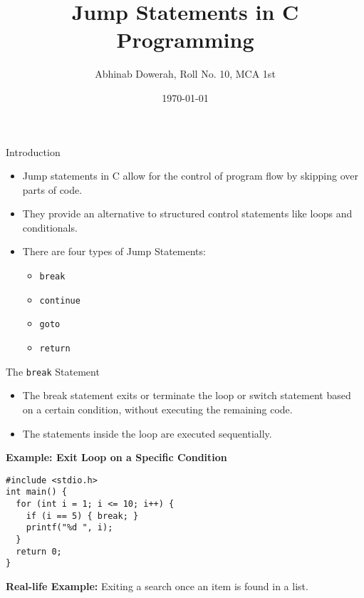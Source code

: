 \documentclass{beamer}
\title{Jump Statements in C Programming}
\author{Abhinab Dowerah, Roll No. 10, MCA 1st}
\date{\today}
\begin{document}
\begin{frame}
    \titlepage
\end{frame}

\begin{frame}{Introduction}
    \begin{itemize}
        \item Jump statements in C allow for the control of program flow by skipping over parts of code.
        \item They provide an alternative to structured control statements like loops and conditionals.
        \item There are four types of Jump Statements:
        \begin{itemize}
            \item \texttt{break}
            \item \texttt{continue}
            \item \texttt{goto}
            \item \texttt{return}
        \end{itemize}
    \end{itemize}
\end{frame}

\begin{frame}{The \texttt{break} Statement}
    \begin{itemize}
        \item The break statement exits or terminate the loop or switch statement based on a certain condition, without executing the remaining code.
        \item The statements inside the loop are executed sequentially.
    \end{itemize}
    \vspace{0.3cm}
    \textbf{Example: Exit Loop on a Specific Condition}
    \begin{block}{}
        \texttt{\#include <stdio.h>}\\
        \texttt{int main() \{}\\
        \texttt{\ \ for (int i = 1; i <= 10; i++) \{}\\
        \texttt{\ \ \ \ if (i == 5) \{ break; \}}\\
        \texttt{\ \ \ \ printf("\%d ", i);}\\
        \texttt{\ \ \}}\\
        \texttt{\ \ return 0;}\\
        \texttt{\}}
    \end{block}
    \textbf{Real-life Example:} Exiting a search once an item is found in a list.
\end{frame}
\end{document}
